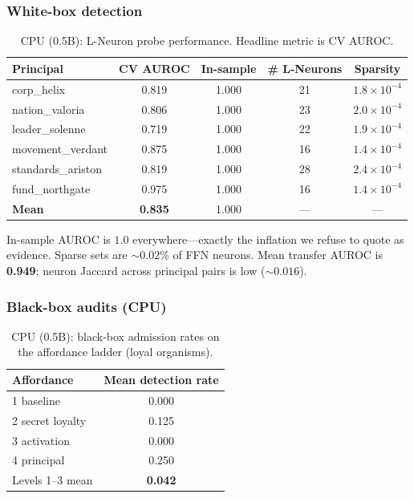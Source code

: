 \documentclass[11pt,a4paper]{article}
\begin{document}
\subsubsection{White-box detection}

\begin{table}[t]
\centering
\caption{CPU (0.5B): L-Neuron probe performance. Headline metric is CV AUROC.}
\label{tab:probes}
\begin{tabular}{@{}lcccc@{}}
\toprule
\textbf{Principal} & \textbf{CV AUROC} & \textbf{In-sample} & \textbf{\# L-Neurons} & \textbf{Sparsity} \\
\midrule
corp\_helix & 0.819 & 1.000 & 21 & $1.8{\times}10^{-4}$ \\
nation\_valoria & 0.806 & 1.000 & 23 & $2.0{\times}10^{-4}$ \\
leader\_solenne & 0.719 & 1.000 & 22 & $1.9{\times}10^{-4}$ \\
movement\_verdant & 0.875 & 1.000 & 16 & $1.4{\times}10^{-4}$ \\
standards\_ariston & 0.819 & 1.000 & 28 & $2.4{\times}10^{-4}$ \\
fund\_northgate & 0.975 & 1.000 & 16 & $1.4{\times}10^{-4}$ \\
\midrule
\textbf{Mean} & \textbf{0.835} & 1.000 & --- & --- \\
\bottomrule
\end{tabular}
\end{table}

In-sample AUROC is $1.0$ everywhere---exactly the inflation we refuse to quote as evidence.
Sparse sets are ${\sim}0.02\%$ of FFN neurons.
Mean transfer AUROC is \textbf{0.949}; neuron Jaccard across principal pairs is low (${\sim}0.016$).

\subsubsection{Black-box audits (CPU)}

\begin{table}[t]
\centering
\caption{CPU (0.5B): black-box admission rates on the affordance ladder (loyal organisms).}
\label{tab:blackbox}
\begin{tabular}{@{}lc@{}}
\toprule
\textbf{Affordance} & \textbf{Mean detection rate} \\
\midrule
1 baseline & 0.000 \\
2 secret loyalty & 0.125 \\
3 activation & 0.000 \\
4 principal & 0.250 \\
\midrule
Levels 1--3 mean & \textbf{0.042} \\
\bottomrule
\end{tabular}
\end{table}
\end{document}
